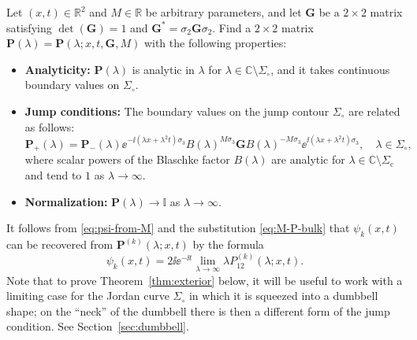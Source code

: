 \begin{rhp}
Let $(x,t)\in\mathbb{R}^2$ and $M\in\mathbb{R}$ be arbitrary parameters, and let $\mathbf{G}$ be a $2\times 2$ matrix satisfying $\det(\mathbf{G})=1$ and $\mathbf{G}^*=\sigma_2\mathbf{G}\sigma_2$.  Find a $2\times 2$ matrix $\mathbf{P}(\lambda)=\mathbf{P}(\lambda;x,t,\mathbf{G},M)$ with the following properties:
\begin{itemize}
\item[]\textbf{Analyticity:}  $\mathbf{P}(\lambda)$ is analytic in $\lambda$ for $\lambda\in\mathbb{C}\setminus\Sigma_\circ$, and it takes continuous boundary values on $\Sigma_\circ$.
\item[]\textbf{Jump conditions:}  The boundary values on the jump contour $\Sigma_\circ$ are related as follows:
\begin{equation}
\mathbf{P}_+(\lambda)=%
\mathbf{P}_-(\lambda)
\ee^{-\ii (\lambda x+\lambda^2t)\sigma_3}
B(\lambda)^{M\sigma_3}
\mathbf{G}
B(\lambda)^{-M\sigma_3}
\ee^{\ii(\lambda x+\lambda^2t)\sigma_3},\quad %
\lambda\in\Sigma_\circ,
\label{eq:P-bulk-jump}
\end{equation}
where scalar powers of the Blaschke factor $B(\lambda)$ are analytic for $\lambda\in\mathbb{C}\setminus\Sigma_\mathrm{c}$ and tend to $1$ as $\lambda\to\infty$.
\item[]\textbf{Normalization:}  $\mathbf{P}(\lambda)\to\mathbb{I}$ as $\lambda\to\infty$. 
\end{itemize}
\label{rhp:rogue-wave-reformulation}
\end{rhp}
It follows from \eqref{eq:psi-from-M} and the substitution \eqref{eq:M-P-bulk} that $\psi_k(x,t)$ can be recovered from $\mathbf{P}^{(k)}(\lambda;x,t)$ by the formula
\begin{equation}
\psi_k(x,t)=2\ii\ee^{-\ii t}\lim_{\lambda\to\infty} \lambda P^{(k)}_{12}(\lambda;x,t).
\end{equation}
Note that to prove Theorem~\ref{thm:exterior} below, it will be useful to work with a limiting case for the Jordan curve $\Sigma_\circ$ in which it is squeezed into a dumbbell shape; on the ``neck'' of the dumbbell there is then a different form of the jump condition.  See Section~\ref{sec:dumbbell}.

